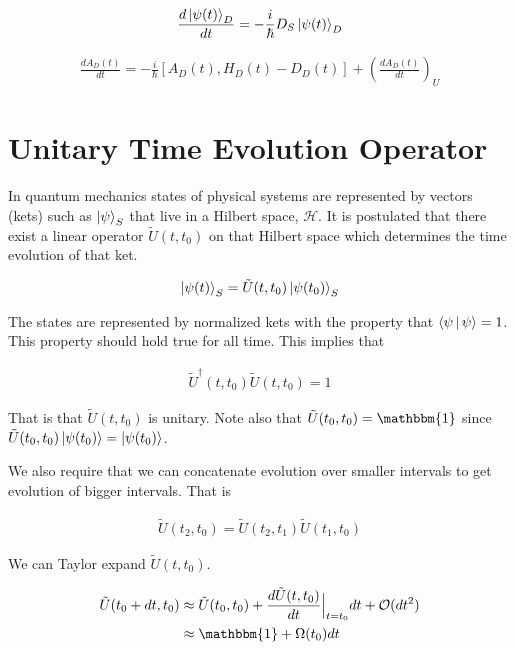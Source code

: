 \documentclass[12pt]{article}
\begin{document}
\begin{align}
\frac{d \ket{\psi(t)}_D}{d t} = -\frac{i}{\hbar}D_S\ket{\psi(t)}_D
\end{align}

\begin{align}
\boxed{\frac{d A_D(t)}{d t} = -\frac{i}{\hbar} \left[A_D(t), H_D(t)-D_D(t)\right] + \left(\frac{d A_D(t)}{d t} \right)_U}
\end{align}


\section{Unitary Time Evolution Operator}

In quantum mechanics states of physical systems are represented by vectors (kets) such as $\ket{\psi}_S$ that live in a Hilbert space, $\mathcal{H}$. It is postulated that there exist a linear operator $\tilde{U}(t,t_0)$ on that Hilbert space which determines the time evolution of that ket.

\begin{align}
\ket{\psi(t)}_S = \tilde{U}(t,t_0) \ket{\psi(t_0)}_S
\end{align}

The states are represented by normalized kets with the property that $\Braket{\psi | \psi} = 1$. This property should hold true for all time. This implies that 

\begin{align}
\tilde{U}^{\dag}(t,t_0)\tilde{U}(t,t_0) = 1
\end{align}


That is that $\tilde{U}(t,t_0)$ is unitary. Note also that $\tilde{U}(t_0,t_0) = \mathbbm{1}$ since $\tilde{U}(t_0,t_0)\ket{\psi(t_0)} = \ket{\psi(t_0)}$.

We also require that we can concatenate evolution over smaller intervals to get evolution of bigger intervals. That is

\begin{align}
\tilde{U}(t_2,t_0) = \tilde{U}(t_2,t_1)\tilde{U}(t_1,t_0)
\end{align}

We can Taylor expand $\tilde{U}(t,t_0)$.

\begin{align}
\tilde{U}(t_0+dt,t_0) &\approx \tilde{U}(t_0,t_0) + \frac{d \tilde{U}(t,t_0)}{dt} \Bigr\rvert_{t=t_0} dt + \mathcal{O}(dt^2)
\\&\approx \mathbbm{1} + \Omega(t_0) dt
\end{align}
\end{document}
